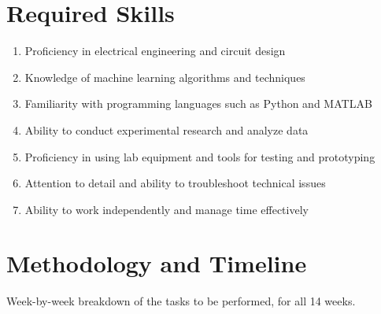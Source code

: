 \documentclass[12pt]{article}
\begin{document}
\section{Required Skills}
\begin{enumerate}
\item Proficiency in electrical engineering and circuit design
\item Knowledge of machine learning algorithms and techniques
\item Familiarity with programming languages such as Python and MATLAB
\item Ability to conduct experimental research and analyze data
\item Proficiency in using lab equipment and tools for testing and prototyping
\item Attention to detail and ability to troubleshoot technical issues
\item Ability to work independently and manage time effectively
\end{enumerate}

\section{Methodology and Timeline}
Week-by-week breakdown of the tasks to be performed, for all 14 weeks.
\end{document}
